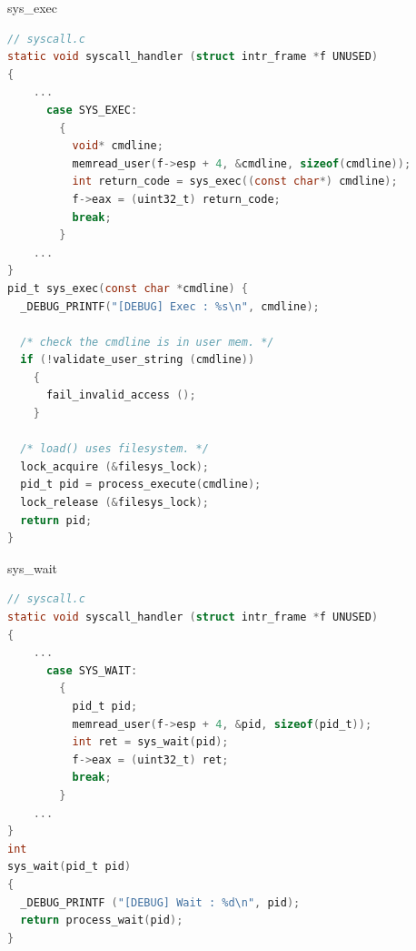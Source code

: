 \documentclass[10pt]{beamer}
\begin{document}
\begin{frame}[fragile]{sys\_exec}
    \begin{lstlisting}[language=C]
// syscall.c
static void syscall_handler (struct intr_frame *f UNUSED) 
{
    ...
      case SYS_EXEC:
        {
          void* cmdline;
          memread_user(f->esp + 4, &cmdline, sizeof(cmdline));
          int return_code = sys_exec((const char*) cmdline);
          f->eax = (uint32_t) return_code;
          break;
        }
    ...
}
pid_t sys_exec(const char *cmdline) {
  _DEBUG_PRINTF("[DEBUG] Exec : %s\n", cmdline);

  /* check the cmdline is in user mem. */
  if (!validate_user_string (cmdline))
    {
      fail_invalid_access ();
    }
  
  /* load() uses filesystem. */
  lock_acquire (&filesys_lock);
  pid_t pid = process_execute(cmdline);
  lock_release (&filesys_lock);
  return pid;
}
    \end{lstlisting}
\end{frame}
\begin{frame}[fragile]{sys\_wait}
    \begin{lstlisting}[language=C]
// syscall.c
static void syscall_handler (struct intr_frame *f UNUSED) 
{
    ...
      case SYS_WAIT:
        {
          pid_t pid;
          memread_user(f->esp + 4, &pid, sizeof(pid_t));
          int ret = sys_wait(pid);
          f->eax = (uint32_t) ret;
          break;
        }
    ...
}
int 
sys_wait(pid_t pid) 
{
  _DEBUG_PRINTF ("[DEBUG] Wait : %d\n", pid);
  return process_wait(pid);
}
    \end{lstlisting}
\end{frame}
\end{document}
